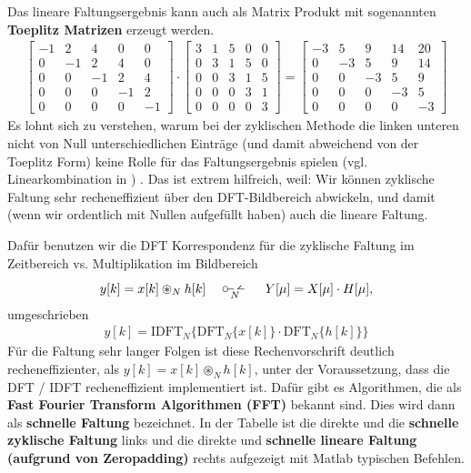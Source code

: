 \begin{ExCalc}
Das lineare Faltungsergebnis kann auch als Matrix Produkt mit sogenannten
\textbf{Toeplitz Matrizen} erzeugt werden.
\begin{align}
\begin{bmatrix}
-1  &   2  &   4  &   0  &   0\\
 0  &  -1  &   2  &   4  &   0\\
 0  &   0  &  -1  &   2  &   4\\
 0  &   0  &   0  &  -1  &   2\\
 0  &   0  &   0  &   0  &  -1
\end{bmatrix}
\cdot
\begin{bmatrix}
3  &   1  &   5  &   0  &   0\\
0  &   3  &   1  &   5  &   0\\
0  &   0  &   3  &   1  &   5\\
0  &   0  &   0  &   3  &   1\\
0  &   0  &   0  &   0  &   3
\end{bmatrix}
=
\begin{bmatrix}
-3  &   5  &   9  &  14  &  20\\
 0  &  -3  &   5  &   9  &  14\\
 0  &   0  &  -3  &   5  &   9\\
 0  &   0  &   0  &  -3  &   5\\
 0  &   0  &   0  &   0  &  -3
\end{bmatrix}
\end{align}
Es lohnt sich zu verstehen, warum bei der zyklischen Methode
die linken unteren
nicht von Null unterschiedlichen Einträge (und damit abweichend von der Toeplitz
Form) keine Rolle für das Faltungsergebnis spielen
(vgl. Linearkombination in )
. Das ist extrem hilfreich, weil:
Wir können zyklische Faltung sehr recheneffizient über den DFT-Bildbereich
abwickeln, und damit (wenn wir ordentlich mit Nullen aufgefüllt haben) auch
die lineare Faltung.

Dafür benutzen wir die DFT Korrespondenz für die zyklische Faltung im
Zeitbereich vs. Multiplikation im Bildbereich
\begin{align}
y[k] = x[k] \circledast_N h[k] \quad\mydft\quad Y[\mu] = X[\mu] \cdot H[\mu],
\end{align}
umgeschrieben
\begin{align}
y[k] = \mathrm{IDFT}_N\{\mathrm{DFT}_N\{x[k]\} \cdot \mathrm{DFT}_N\{h[k]\}\}
\end{align}
Für die Faltung sehr langer Folgen ist diese Rechenvorschrift deutlich
recheneffizienter, als $y[k] = x[k] \circledast_N h[k]$, unter der Voraussetzung,
dass die DFT / IDFT recheneffizient implementiert ist. Dafür gibt es Algorithmen,
die als \textbf{Fast Fourier Transform Algorithmen (FFT)} bekannt sind.
%
Dies wird dann als \textbf{schnelle Faltung} bezeichnet. In der Tabelle
ist die direkte und die \textbf{schnelle zyklische Faltung}
links und die direkte und \textbf{schnelle
lineare Faltung (aufgrund von Zeropadding)} rechts aufgezeigt mit Matlab
typischen Befehlen.
%
\end{ExCalc}

